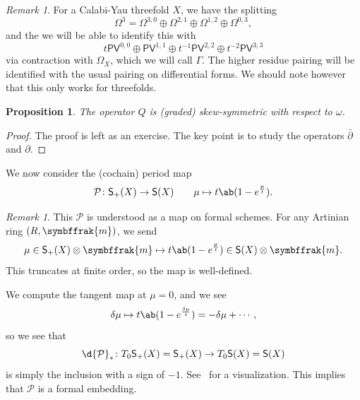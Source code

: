 \documentclass[article,10pt,oneside,oldfontcommands]{memoir}
\newtheorem{prop}[thm]{Proposition}
\theoremstyle{definition}
\theoremstyle{remark}
\newtheorem{rmk}[thm]{Remark}
\theoremstyle{plain}
\theoremstyle{definition}
\theoremstyle{remark}
\newcommand{\mc}[1]{\mathcal{#1}}
\newcommand{\mf}[1]{\symbffrak{#1}}
\newcommand{\ms}[1]{\mathsf{#1}}
\newcommand{\1}{\mathbf{1}}
\newcommand{\2}{\mathbf{2}}
\newcommand{\3}{\mathbf{3}}
\newcommand{\dbar}{\bar{\partial}}
\begin{document}
\begin{rmk}
    For a Calabi-Yau threefold \(X\), we have the splitting
    \[ \Omega^3 = \Omega^{3,0} \oplus \Omega^{2,1} \oplus \Omega^{1,2} \oplus \Omega^{0,3}, \]
    and the we will be able to identify this with
    \[ t \ms{PV}^{0,0} \oplus \ms{PV}^{1,1} \oplus t^{-1} \ms{PV}^{2,2} \oplus t^{-2} \ms{PV}^{3,3} \]
    via contraction with \(\Omega_X\), which we will call \(\Gamma\). The higher residue pairing will be identified with the usual pairing on differential forms. We should note however that this only works for threefolds.
\end{rmk}

\begin{prop}
    The operator \(Q\) is (graded) skew-symmetric with respect to \(\omega\).
\end{prop}

\begin{proof}
    The proof is left as an exercise. The key point is to study the operators \(\dbar\) and \(\partial\).
\end{proof}

We now consider the (cochain) period map
\[ \mc{P} \colon \ms{S}_+(X) \to \ms{S}(X) \qquad \mu \mapsto t \ab(1-e^{\frac{\mu}{t}}). \]

\begin{rmk}
    This \(\mc{P}\) is understood as a map on formal schemes. For any Artinian ring \((R, \mf{m})\), we send
    \[ \mu \in \ms{S}_+(X) \otimes \mf{m} \mapsto t \ab(1-e^{\frac{\mu}{t}}) \in \ms{S}(X) \otimes \mf{m}. \]
    This truncates at finite order, so the map is well-defined.
\end{rmk}

We compute the tangent map at \(\mu = 0\), and we see
\[ \delta \mu \mapsto t \ab(1 - e^{\frac{\delta \mu}{t}}) = - \delta \mu + \cdots, \]
so we see that
\[ \d{\mc{P}}_* \colon T_0 \ms{S}_+(X) = \ms{S}_+(X) \to T_0 \ms{S}(X) = \ms{S}(X) \]
is simply the inclusion with a sign of \(-1\). See~ for a visualization. This implies that \(\mc{P}\) is a formal embedding.
\end{document}
